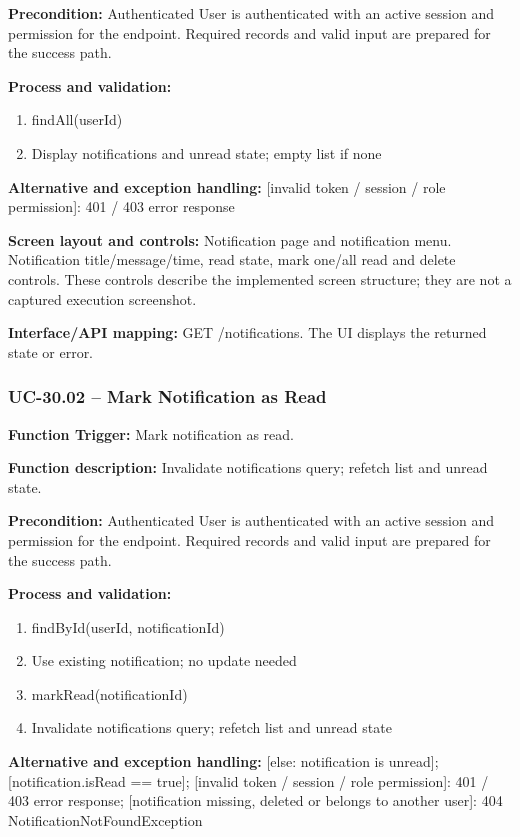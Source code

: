 \textbf{Precondition:} Authenticated User is authenticated with an active session and permission for the endpoint. Required records and valid input are prepared for the success path.

\textbf{Process and validation:}
\begin{enumerate}
\item find\allowbreak{}All(user\allowbreak{}Id)
\item Display notifications and unread state; empty list if none
\end{enumerate}
\textbf{Alternative and exception handling:} [invalid token /\allowbreak{} session /\allowbreak{} role permission]: 401 /\allowbreak{} 403 error response

\textbf{Screen layout and controls:} Notification page and notification menu. Notification title/\allowbreak{}message/\allowbreak{}time, read state, mark one/\allowbreak{}all read and delete controls. These controls describe the implemented screen structure; they are not a captured execution screenshot.

\textbf{Interface/\allowbreak{}API mapping:} GET /\allowbreak{}notifications. The UI displays the returned state or error.

\subsubsection{UC-30.02 -- Mark Notification as Read}
\textbf{Function Trigger:} Mark notification as read.

\textbf{Function description:} Invalidate notifications query; refetch list and unread state.

\textbf{Precondition:} Authenticated User is authenticated with an active session and permission for the endpoint. Required records and valid input are prepared for the success path.

\textbf{Process and validation:}
\begin{enumerate}
\item find\allowbreak{}By\allowbreak{}Id(user\allowbreak{}Id, notification\allowbreak{}Id)
\item Use existing notification; no update needed
\item mark\allowbreak{}Read(notification\allowbreak{}Id)
\item Invalidate notifications query; refetch list and unread state
\end{enumerate}
\textbf{Alternative and exception handling:} [else: notification is unread]; [notification.is\allowbreak{}Read =\allowbreak{}=\allowbreak{} true]; [invalid token /\allowbreak{} session /\allowbreak{} role permission]: 401 /\allowbreak{} 403 error response; [notification missing, deleted or belongs to another user]: 404 Notification\allowbreak{}Not\allowbreak{}Found\allowbreak{}Exception

